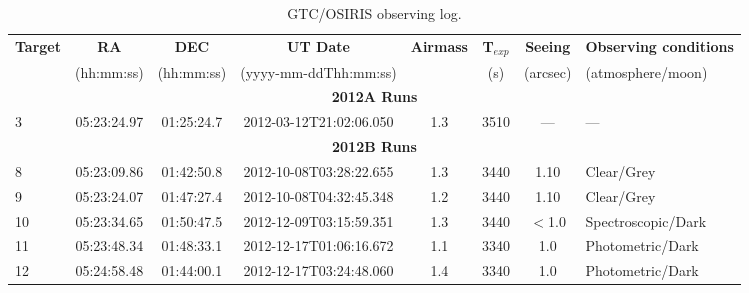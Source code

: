 \documentclass[12pt]{article}
\begin{document}
\begin{table} \tiny
\begin{center}
 \caption{GTC/OSIRIS observing log.}
 \label{tab:OSIRIS_log}
 \begin{threeparttable}
  	\setlength{\tabcolsep}{11pt}
	\begin{tabular}{lccccccl}
	\toprule
	{\bf Target} & {\bf RA}    & {\bf DEC}    & {\bf UT Date}        & {\bf Airmass} & {\bf T$_{exp}$} & {\bf Seeing} &  {\bf Observing conditions} \\
	             & (hh:mm:ss)  & (hh:mm:ss)   &(yyyy-mm-ddThh:mm:ss) &               & (s)             & (arcsec)     &  (atmosphere/moon)          \\
	\midrule
	\multicolumn{8}{c}{{\bf 2012A Runs}} \\
	3  & 05:23:24.97 & 01:25:24.7 & 2012-03-12T21:02:06.050 & 1.3  & 3510 & ---      & ---                 \\
	\multicolumn{8}{c}{{\bf 2012B Runs}} \\
	8  & 05:23:09.86 & 01:42:50.8 & 2012-10-08T03:28:22.655 & 1.3  & 3440 & 1.10     & Clear/Grey          \\
	9  & 05:23:24.07 & 01:47:27.4 & 2012-10-08T04:32:45.348 & 1.2  & 3440 & 1.10     & Clear/Grey          \\
	10 & 05:23:34.65 & 01:50:47.5 & 2012-12-09T03:15:59.351 & 1.3  & 3440 & $<$1.0   & Spectroscopic/Dark  \\
	11 & 05:23:48.34 & 01:48:33.1 & 2012-12-17T01:06:16.672 & 1.1  & 3340 & 1.0      & Photometric/Dark    \\
	12 & 05:24:58.48 & 01:44:00.1 & 2012-12-17T03:24:48.060 & 1.4  & 3340 & 1.0      & Photometric/Dark    \\

\end{tabular}
\end{threeparttable}
\end{center}
\end{table}
\end{document}
